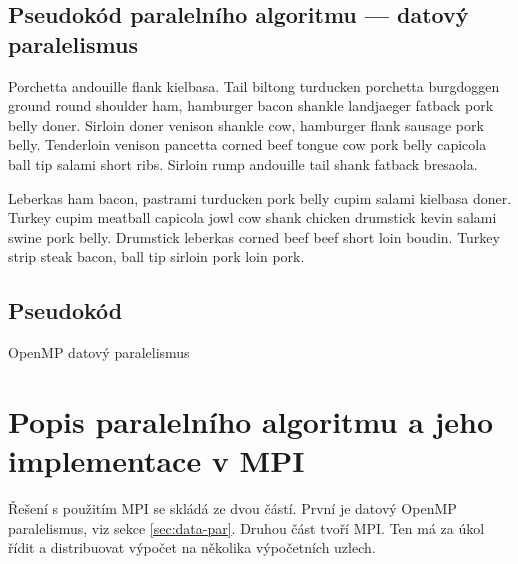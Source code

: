 \documentclass{article}
\begin{document}
    \subsection{Pseudokód paralelního algoritmu — datový paralelismus}
    Porchetta andouille flank kielbasa. Tail biltong turducken porchetta burgdoggen ground round shoulder ham, hamburger bacon shankle landjaeger fatback pork belly doner. Sirloin doner venison shankle cow, hamburger flank sausage pork belly. Tenderloin venison pancetta corned beef tongue cow pork belly capicola ball tip salami short ribs. Sirloin rump andouille tail shank fatback bresaola.

    Leberkas ham bacon, pastrami turducken pork belly cupim salami kielbasa doner. Turkey cupim meatball capicola jowl cow shank chicken drumstick kevin salami swine pork belly. Drumstick leberkas corned beef beef short loin boudin. Turkey strip steak bacon, ball tip sirloin pork loin pork.

    \subsection{Pseudokód}

    \begin{algorithm}[H]
        \SetAlgoLined

        \BlankLine

        \;
        \caption{OpenMP datový paralelismus}
        \label{alg:data-par}
    \end{algorithm}


    \section{Popis paralelního algoritmu a jeho implementace v MPI}
    
    Řešení s použitím MPI se skládá ze dvou částí. První je datový OpenMP paralelismus, 
    viz sekce \ref{sec:data-par}. Druhou část tvoří MPI. Ten má za úkol řídit a distribuovat
    výpočet na několika výpočetních uzlech.
\end{document}

